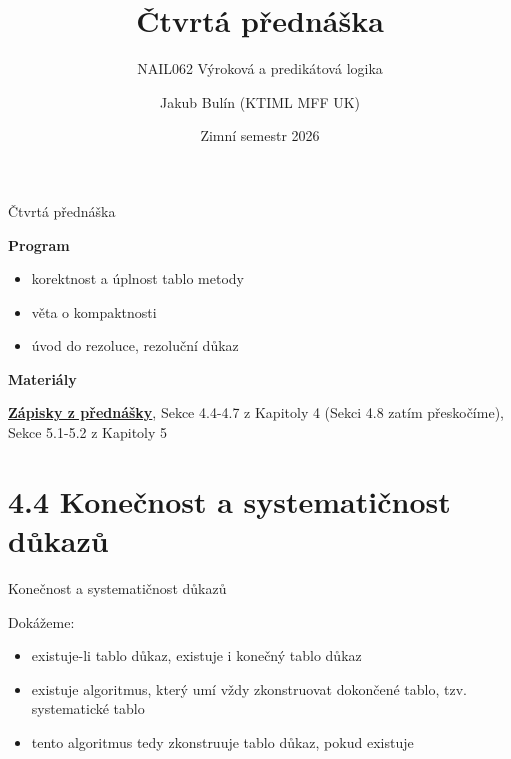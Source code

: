 \documentclass{beamer}
\title{Čtvrtá přednáška}
\subtitle{NAIL062 Výroková a predikátová logika}
\author{Jakub Bulín (KTIML MFF UK)}
\date{Zimní semestr 2026}
\begin{document}
\maketitle


\begin{frame}{Čtvrtá přednáška}

    \textbf{Program}
        \begin{itemize}            
            \item korektnost a úplnost tablo metody
            \item věta o kompaktnosti
            \item úvod do rezoluce, rezoluční důkaz
        \end{itemize}

    \textbf{Materiály}

        \href{https://github.com/jbulin-mff-uk/nail062/raw/main/lecture/lecture-notes/lecture-notes.pdf}{\alert{\textbf{Zápisky z přednášky}}}, Sekce 4.4-4.7 z Kapitoly 4 (Sekci 4.8 zatím přeskočíme), Sekce 5.1-5.2 z Kapitoly 5

\end{frame}


\section{4.4 Konečnost a systematičnost důkazů}


\begin{frame}{Konečnost a systematičnost důkazů}

    Dokážeme:
    \begin{itemize}[<+->]
        \item existuje-li tablo důkaz, existuje i \alert{konečný} tablo důkaz
        \item existuje algoritmus, který umí vždy zkonstruovat dokončené tablo, tzv. \alert{systematické tablo}
        \item tento algoritmus tedy \alert{zkonstruuje tablo důkaz}, pokud existuje 
        
        \medskip
        
        
        \medskip
    \end{itemize}
    

\end{frame}
\end{document}
